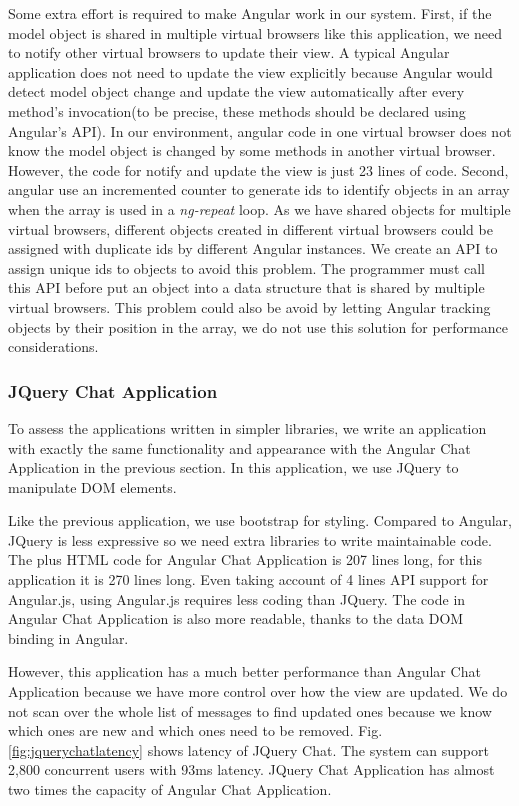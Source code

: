 Some extra effort is required to make Angular work in our system.
First, if the model object is shared in multiple virtual browsers like this application,
we need to notify other virtual browsers to update their view.
A typical Angular application does not need to update the view explicitly because
Angular would detect model object change and update the view automatically
after every method's invocation(to be precise, these methods should be declared using Angular's API).
In our environment, angular code in one virtual browser does not know the model object
is changed by some methods in another virtual browser.
However, the code for notify and update the view is just 23 lines of code.
Second, angular use an incremented counter to generate ids to identify objects in an array when the
array is used in a \emph{ng-repeat} loop.
As we have shared objects for multiple virtual browsers,
different objects created in different virtual browsers could be assigned with duplicate
ids by different Angular instances.
We create an API to assign unique ids to objects to avoid this problem.
The programmer must call this API before put an object into a data structure that is shared
by multiple virtual browsers.
This problem could also be avoid by letting Angular tracking objects by their position in the array,
we do not use this solution for performance considerations.


\angularchatlatency{}

\subsubsection{JQuery Chat Application}
\label{sec:jquery}
To assess the applications written in simpler \js{} libraries,
we write an application with exactly the same functionality and
appearance with the Angular Chat Application in the previous section.
In this application, we use JQuery to manipulate DOM elements.

Like the previous application, we use bootstrap for styling.
Compared to Angular, JQuery is less expressive so we need
extra libraries to write maintainable code.
The \js{} plus HTML code for Angular Chat Application is 207 lines long,
for this application it is 270 lines long.
Even taking account of 4 lines API support for Angular.js,
using Angular.js requires less coding than JQuery.
The code in Angular Chat Application is also more readable,
thanks to the data DOM binding in Angular.

However, this application has a much better performance than Angular
Chat Application because we have more control over how the view
are updated.
We do not scan over the whole list of messages to find updated ones
because we know which ones are new and which ones need to be removed.
Fig.\ref{fig:jquerychatlatency} shows latency of JQuery Chat.
The system can support 2,800 concurrent users with 93ms latency.
JQuery Chat Application has almost two times the capacity of Angular Chat Application.


